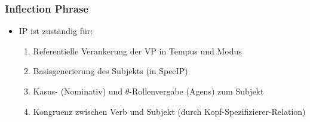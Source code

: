 \begin{frame}
\frametitle{Inflection Phrase}


	\begin{itemize}
		\item IP ist zuständig für:
		\begin{enumerate}
			\item Referentielle Verankerung der VP in Tempus und Modus
			\item Basisgenerierung des Subjekts (in SpecIP)
			\item Kasus- (Nominativ) und $\theta$-Rollenvergabe (Agens) zum Subjekt
			\item Kongruenz zwischen Verb und Subjekt (durch Kopf-Spezifizierer-Relation)
		\end{enumerate}				
	\end{itemize}


\begin{figure}[b]
  	\begin{minipage}[b]{0.45\textwidth}
	\centering
  	\end{minipage}  
 	\pause            
	\begin{minipage}[b]{0.45\textwidth}
	\centering
  	\end{minipage}  
\end{figure}

\end{frame}


